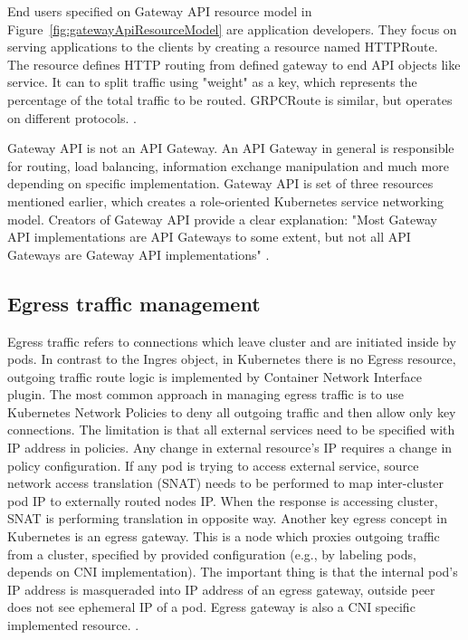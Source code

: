 End users specified on Gateway API resource model in Figure~\ref{fig:gatewayApiResourceModel} are application developers. They focus on serving applications to the clients by creating a resource named HTTPRoute. The resource defines HTTP routing from defined gateway to end API objects like service. It can to split traffic using "weight" as a key, which represents the percentage of the total traffic to be routed. GRPCRoute is similar, but operates on different protocols. \cite{KubernetesGatewayAPI} \cite{KubernetesHTTPRoute}. 



Gateway API is not an API Gateway. An API Gateway in general is responsible for routing, load balancing, information exchange manipulation and much more depending on specific implementation. Gateway API is set of three resources mentioned earlier, which creates a role-oriented Kubernetes service networking model. Creators of Gateway API provide a clear explanation: "Most Gateway API implementations are API Gateways to some extent, but not all API Gateways are Gateway API implementations" \cite{KubernetesGatewayAPI}. 


\subsection{Egress traffic management}
\label{sec:egressTrafficMngmnt}

Egress traffic refers to connections which leave cluster and are initiated inside by pods. In contrast to the Ingres object, in Kubernetes there is no Egress resource, outgoing traffic route logic is implemented by Container Network Interface plugin. The most common approach in managing egress traffic is to use Kubernetes Network Policies to deny all outgoing traffic and then allow only key connections. The limitation is that all external services need to be specified with IP address in policies. Any change in external resource's IP requires a change in policy configuration. If any pod is trying to access external service, source network access translation (SNAT) needs to be performed to map inter-cluster pod IP to externally routed nodes IP. When the response is accessing cluster, SNAT is performing translation in opposite way. Another key egress concept in Kubernetes is an egress gateway. This is a node which proxies outgoing traffic from a cluster, specified by provided configuration (e.g., by labeling pods, depends on CNI implementation). The important thing is that the internal pod's IP address is masqueraded into IP address of an egress gateway, outside peer does not see ephemeral IP of a pod. Egress gateway is also a CNI specific implemented resource. \cite{CalicoEgress} \cite{CiliumEgressGateway}. 


